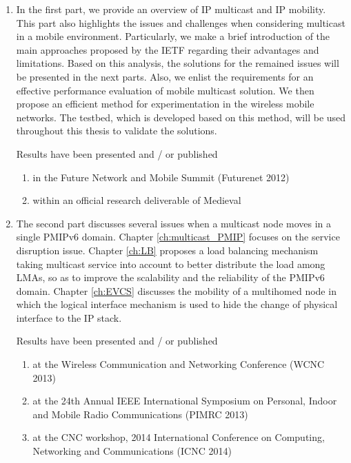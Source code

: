 \begin{enumerate}
\item In the first part, we provide an overview of IP multicast and IP mobility. This part also highlights the issues and challenges when considering multicast in a mobile environment. Particularly, we make a brief introduction of the main approaches proposed by the IETF regarding their advantages and limitations. Based on this analysis, the solutions for the remained issues will be presented in the next parts. Also, we enlist the requirements for an effective performance evaluation of mobile multicast solution. We then propose an efficient method for experimentation in the wireless mobile networks. The testbed, which is developed based on this method, will be used throughout this thesis to validate the solutions. 

Results have been presented and / or published
\begin{enumerate}
\item in the Future Network and Mobile Summit (Futurenet 2012) \cite{Thinh_futurenet}
\item within an official research deliverable of Medieval \cite{d4.2, d4.3}
\end{enumerate}

\item The second part discusses several issues when a multicast node moves in a single PMIPv6 domain. Chapter \ref{ch:multicast_PMIP} focuses on the service disruption issue. Chapter \ref{ch:LB} proposes a load balancing mechanism taking multicast service into account to better distribute the load among LMAs, so as to improve the scalability and the reliability of the PMIPv6 domain. Chapter \ref{ch:EVCS} discusses the mobility of a multihomed node in which the logical interface mechanism is used to hide the change of physical interface to the IP stack.

Results have been presented and / or published
\begin{enumerate}
\item at the Wireless Communication and Networking Conference (WCNC 2013) \cite{Thinh_WCNC_Multicast}
\item at the 24th Annual IEEE International Symposium on Personal, Indoor and Mobile Radio Communications (PIMRC 2013) \cite{PMIP_EV}
\item at the CNC workshop, 2014 International Conference on Computing, Networking and Communications (ICNC 2014) \cite{Thinh_ICNC}
\end{enumerate}


\end{enumerate}
